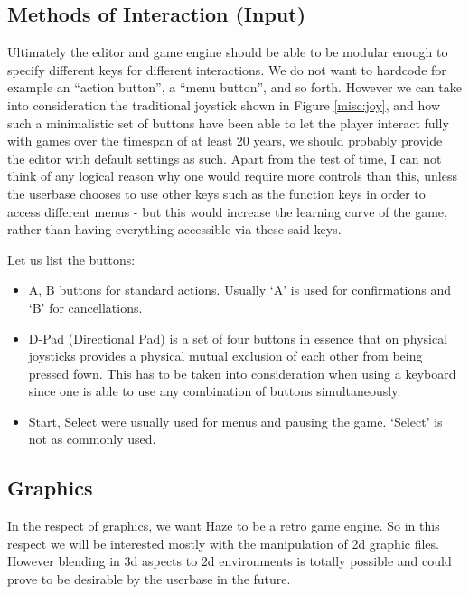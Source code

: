 \subsection{Methods of Interaction (Input)}

Ultimately the editor and game engine should be able to be modular enough to
specify different keys for different interactions. We do not want to hardcode
for example an ``action button'', a ``menu button'', and so forth. However we
can take into consideration the traditional joystick shown in Figure
\ref{misc:joy}, and how such a minimalistic set of buttons have been able to
let the player interact fully with games over the timespan of at least 20 years,
we should probably provide the editor with default settings as such. Apart from
the test of time, I can not think of any logical reason why one would require
more controls than this, unless the userbase chooses to use other keys such as
the function keys in order to access different menus - but this would increase
the learning curve of the game, rather than having everything accessible via
these said keys.


Let us list the buttons:
\begin{itemize}
\item{A, B} buttons for standard actions. Usually `A' is used for confirmations
and `B' for cancellations.
\item{D-Pad (Directional Pad)} is a set of four buttons in essence that on
physical joysticks provides a physical mutual exclusion of each other from
being pressed fown. This has to be taken into consideration when using a
keyboard since one is able to use any combination of buttons simultaneously.
\item{Start, Select} were usually used for menus and pausing the game. `Select'
is not as commonly used.
\end{itemize}

\subsection{Graphics}

In the respect of graphics, we want Haze to be a retro game engine. So in this
respect we will be interested mostly with the manipulation of 2d graphic files.
However blending in 3d aspects to 2d environments is totally possible and could
prove to be desirable by the userbase in the future.

